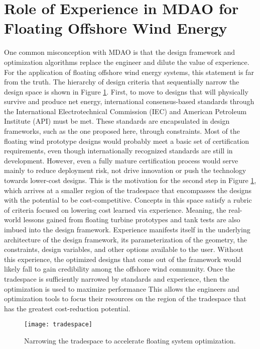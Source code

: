 \section{Role of Experience in MDAO for Floating Offshore Wind Energy}
One common misconception with MDAO is that the design framework and
optimization algorithms replace the engineer and dilute the value of
experience.  For the application of floating offshore wind energy
systems, this statement is far from the truth.  The hierarchy of design
criteria that sequentially narrow the design space is shown in Figure
\ref{fig:tradespace}.  First, to move to designs that will physically
survive and produce net energy, international consensus-based standards
through the International Electrotechnical Commission (IEC) and American
Petroleum Institute (API) must be met.  These standards are encapsulated
in design frameworks, such as the one proposed here, through
constraints.  Most of the floating wind prototype designs would probably
meet a basic set of certification requirements, even though
internationally recognized standards are still in development.  However,
even a fully mature certification process would serve mainly to reduce
deployment risk, not drive innovation or push the technology towards
lower-cost designs.  This is the motivation for the second step in
Figure \ref{fig:tradespace}, which arrives at a smaller region of the
tradespace that encompasses the designs with the potential to be
cost-competitive.  Concepts in this space satisfy a rubric of criteria
focused on lowering cost learned via experience.  Meaning, the
real-world lessons gained from floating turbine prototypes and tank
tests are also imbued into the design framework.  Experience manifests
itself in the underlying architecture of the design framework, its
parameterization of the geometry, the constraints, design variables, and
other options available to the user.  Without this experience, the
optimized designs that come out of the framework would likely fall to
gain credibility among the offshore wind community.  Once the tradespace
is sufficiently narrowed by standards and experience, then the
optimization is used to maximize performance This allows the engineers
and optimization tools to focus their resources on the region of the
tradespace that has the greatest cost-reduction potential.

\begin{figure}[htbp]
  \begin{center}
    \texttt{[image: tradespace]}\\
    \caption{Narrowing the tradespace to accelerate floating system optimization.}
    \label{fig:tradespace}
  \end{center}
\end{figure}


